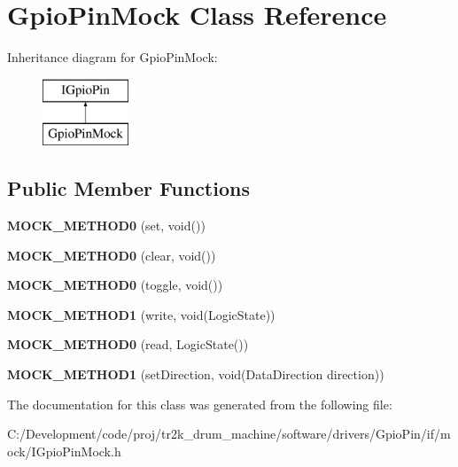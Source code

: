 \hypertarget{class_gpio_pin_mock}{}\section{Gpio\+Pin\+Mock Class Reference}
\label{class_gpio_pin_mock}
Inheritance diagram for Gpio\+Pin\+Mock\+:\begin{figure}[H]
\begin{center}
\leavevmode
\includegraphics[height=2.000000cm]{class_gpio_pin_mock}
\end{center}
\end{figure}
\subsection*{Public Member Functions}
\begin{DoxyCompactItemize}
\item 
\mbox{\label{class_gpio_pin_mock_a56f146c2b2a2bae6fd4cefb9d152b713}} 
{\bfseries M\+O\+C\+K\+\_\+\+M\+E\+T\+H\+O\+D0} (set, void())
\item 
\mbox{\label{class_gpio_pin_mock_aa8fbc0b168892c31b9f2fa8f7b441fb8}} 
{\bfseries M\+O\+C\+K\+\_\+\+M\+E\+T\+H\+O\+D0} (clear, void())
\item 
\mbox{\label{class_gpio_pin_mock_a360e0ac070c5fc973837f202d09231b8}} 
{\bfseries M\+O\+C\+K\+\_\+\+M\+E\+T\+H\+O\+D0} (toggle, void())
\item 
\mbox{\label{class_gpio_pin_mock_a70637e5cff06f90e89abf1bea0af5f1b}} 
{\bfseries M\+O\+C\+K\+\_\+\+M\+E\+T\+H\+O\+D1} (write, void(Logic\+State))
\item 
\mbox{\label{class_gpio_pin_mock_a782457feb32b410b8bf159adf6f51527}} 
{\bfseries M\+O\+C\+K\+\_\+\+M\+E\+T\+H\+O\+D0} (read, Logic\+State())
\item 
\mbox{\label{class_gpio_pin_mock_ae9c2e1480c656283b64271eb6aca67a7}} 
{\bfseries M\+O\+C\+K\+\_\+\+M\+E\+T\+H\+O\+D1} (set\+Direction, void(Data\+Direction direction))
\end{DoxyCompactItemize}


The documentation for this class was generated from the following file\+:\begin{DoxyCompactItemize}
\item 
C\+:/\+Development/code/proj/tr2k\+\_\+drum\+\_\+machine/software/drivers/\+Gpio\+Pin/if/mock/I\+Gpio\+Pin\+Mock.\+h\end{DoxyCompactItemize}
